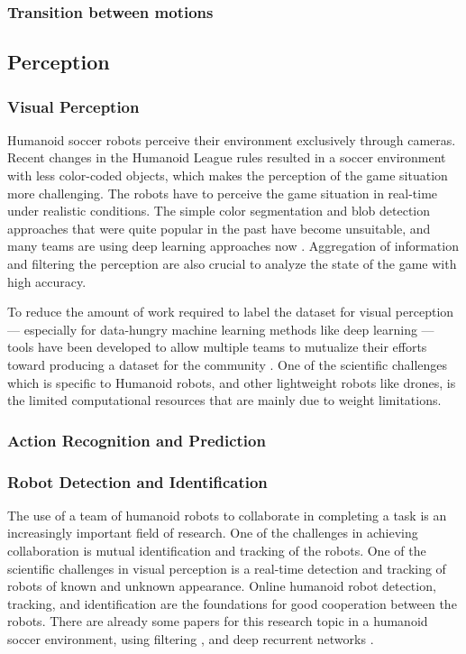 \documentclass{article}
\begin{document}
\subsubsection{Transition between motions}


\subsection{Perception}
\subsubsection{Visual Perception}
Humanoid soccer robots perceive their environment exclusively through cameras. 
Recent changes in the Humanoid League rules resulted in a soccer environment with less color-coded objects, which makes the perception of the game situation more challenging.
The robots have to perceive the game situation in real-time under realistic conditions.
The simple color segmentation and blob detection approaches that were quite popular in the past \cite{Farazi2015} have become unsuitable, and many teams are using deep learning approaches now \cite{ficht2018nimbro} \cite{schnekenburger2017detection}. 
Aggregation of information and filtering the perception are also crucial to analyze the state of the game with high accuracy.

To reduce the amount of work required to label the dataset for visual perception --- especially for data-hungry machine learning methods like deep learning --- tools have been developed to allow multiple teams to mutualize their efforts toward producing a dataset for the community \cite{imagetagger2018}.
One of the scientific challenges which is specific to Humanoid robots, and other lightweight robots like drones, is the limited computational resources that are mainly due to weight limitations. 


\subsubsection{Action Recognition and Prediction}


\subsubsection{Robot Detection and Identification}
The use of a team of humanoid robots to collaborate in completing a task is an increasingly important field of research. 
One of the challenges in achieving collaboration is mutual identification and tracking of the robots. One of the scientific challenges in visual perception is a real-time detection and tracking of robots of known and unknown appearance.
Online humanoid robot detection, tracking, and identification are the foundations for good cooperation between the robots. 
There are already some papers for this research topic in a humanoid soccer environment, using filtering \cite{farazi2016real}, and deep recurrent networks \cite{farazi2017online}.
\end{document}
